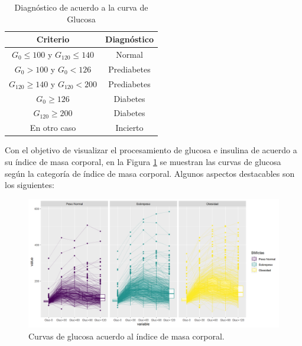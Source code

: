 \begin{table}[H]
\centering
\begin{tabular}{||c|c||}
\hline\hline
\textbf{Criterio}                       & \textbf{Diagnóstico} \\ \hline\hline
$G_0 \leq100$ y $G_{120} \leq 140$   & Normal               \\ \hline
$G_{0} > 100$ y $G_{0} < 126$  & Prediabetes          \\ \hline
$G_{120} \geq 140$ y $G_{120} < 200$ & Prediabetes          \\ \hline
$G_0 \geq 126$                     & Diabetes             \\ \hline
$G_{120} \geq 200$                  & Diabetes             \\ \hline
En otro caso                            & Incierto              \\ \hline\hline
\end{tabular}
\caption{Diagnóstico de acuerdo a la curva de Glucosa}
\label{tab:diagnostico}
\end{table}

Con el objetivo de visualizar el procesamiento de glucosa e insulina de acuerdo a su índice de masa corporal, en la Figura \ref{fig:CurvasGluIBM} se muestran las curvas de glucosa según la categoría de índice de masa corporal. Algunos aspectos destacables son los siguientes: 

\begin{figure}[H]
    \centering
    \includegraphics[width = 0.9 \textwidth]{Imagenes/gluCurvasBMI.png}
    \caption{Curvas de glucosa acuerdo al índice de masa corporal.}
    \label{fig:CurvasGluIBM}
\end{figure}

